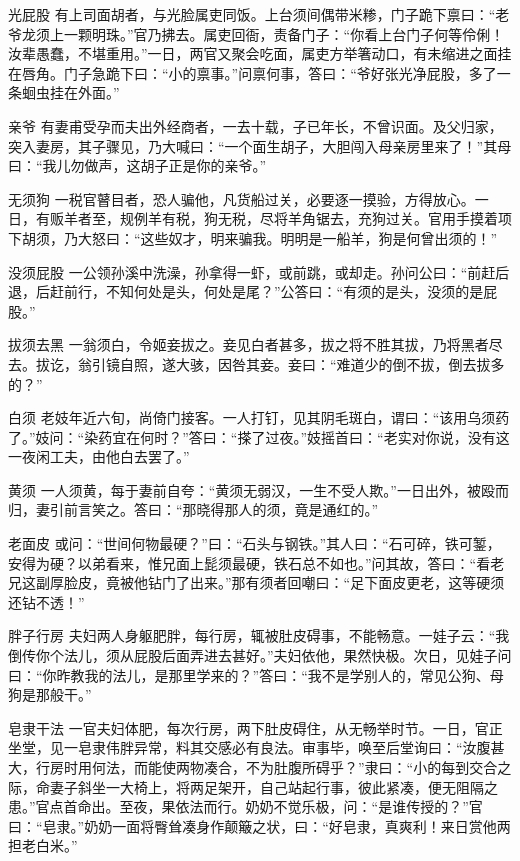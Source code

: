 \documentclass[12pt,UTF8]{ctexbook}
\begin{document}
光屁股
有上司面胡者，与光脸属吏同饭。上台须间偶带米糁，门子跪下禀曰：“老爷龙须上一颗明珠。”官乃拂去。属吏回衙，责备门子：“你看上台门子何等伶俐！汝辈愚蠢，不堪重用。”一日，两官又聚会吃面，属吏方举箸动口，有未缩进之面挂在唇角。门子急跪下曰：“小的禀事。”问禀何事，答曰：“爷好张光净屁股，多了一条蛔虫挂在外面。”

亲爷
有妻甫受孕而夫出外经商者，一去十载，子已年长，不曾识面。及父归家，突入妻房，其子骤见，乃大喊曰：“一个面生胡子，大胆闯入母亲房里来了！”其母曰：“我儿勿做声，这胡子正是你的亲爷。”

无须狗
一税官瞽目者，恐人骗他，凡货船过关，必要逐一摸验，方得放心。一日，有贩羊者至，规例羊有税，狗无税，尽将羊角锯去，充狗过关。官用手摸着项下胡须，乃大怒曰：“这些奴才，明来骗我。明明是一船羊，狗是何曾出须的！”

没须屁股
一公领孙溪中洗澡，孙拿得一虾，或前跳，或却走。孙问公曰：“前赶后退，后赶前行，不知何处是头，何处是尾？”公答曰：“有须的是头，没须的是屁股。”

拔须去黑
一翁须白，令姬妾拔之。妾见白者甚多，拔之将不胜其拔，乃将黑者尽去。拔讫，翁引镜自照，遂大骇，因咎其妾。妾曰：“难道少的倒不拔，倒去拔多的？”

白须
老妓年近六旬，尚倚门接客。一人打钉，见其阴毛斑白，谓曰：“该用乌须药了。”妓问：“染药宜在何时？”答曰：“搽了过夜。”妓摇首曰：“老实对你说，没有这一夜闲工夫，由他白去罢了。”

黄须
一人须黄，每于妻前自夸：“黄须无弱汉，一生不受人欺。”一日出外，被殴而归，妻引前言笑之。答曰：“那晓得那人的须，竟是通红的。”

老面皮
或问：“世间何物最硬？”曰：“石头与钢铁。”其人曰：“石可碎，铁可錾，安得为硬？以弟看来，惟兄面上髭须最硬，铁石总不如也。”问其故，答曰：“看老兄这副厚脸皮，竟被他钻门了出来。”那有须者回嘲曰：“足下面皮更老，这等硬须还钻不透！”

胖子行房
夫妇两人身躯肥胖，每行房，辄被肚皮碍事，不能畅意。一娃子云：“我倒传你个法儿，须从屁股后面弄进去甚好。”夫妇依他，果然快极。次日，见娃子问曰：“你昨教我的法儿，是那里学来的？”答曰：“我不是学别人的，常见公狗、母狗是那般干。”

皂隶干法
一官夫妇体肥，每次行房，两下肚皮碍住，从无畅举时节。一日，官正坐堂，见一皂隶伟胖异常，料其交感必有良法。审事毕，唤至后堂询曰：“汝腹甚大，行房时用何法，而能使两物凑合，不为肚腹所碍乎？”隶曰：“小的每到交合之际，命妻子斜坐一大椅上，将两足架开，自己站起行事，彼此紧凑，便无阻隔之患。”官点首命出。至夜，果依法而行。奶奶不觉乐极，问：“是谁传授的？”官曰：“皂隶。”奶奶一面将臀耸凑身作颠簸之状，曰：“好皂隶，真爽利！来日赏他两担老白米。”
\end{document}
